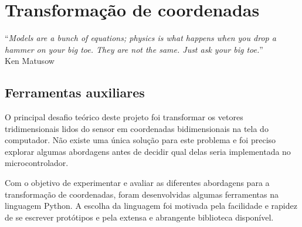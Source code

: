 \documentclass[brazil,pagestart=firstchapter]{abnt}
\begin{document}
%
%


%
%


\chapter{Transformação de coordenadas}
\label{cap:coordenadas}


\vfill{}
\begin{flushright}{}
``\emph{Models are a bunch of equations; physics is what happens when you
drop a hammer on your big toe. They are not the same. Just ask your big
toe.}''\\
{\small Ken Matusow}
\end{flushright}{\small \par}
\vfill{}

\newpage


\section{Ferramentas auxiliares}
\label{sec:ferramentas}

O principal desafio teórico deste projeto foi transformar os vetores
tridimensionais lidos do sensor em coordenadas bidimensionais na tela do
computador. Não existe uma única solução para este problema e foi preciso
explorar algumas abordagens antes de decidir qual delas seria implementada
no microcontrolador.

Com o objetivo de experimentar e avaliar as diferentes abordagens para a
transformação de coordenadas, foram desenvolvidas algumas ferramentas
na linguagem Python. A escolha da linguagem foi motivada pela facilidade e
rapidez de se escrever protótipos e pela extensa e abrangente biblioteca
disponível.
\end{document}
